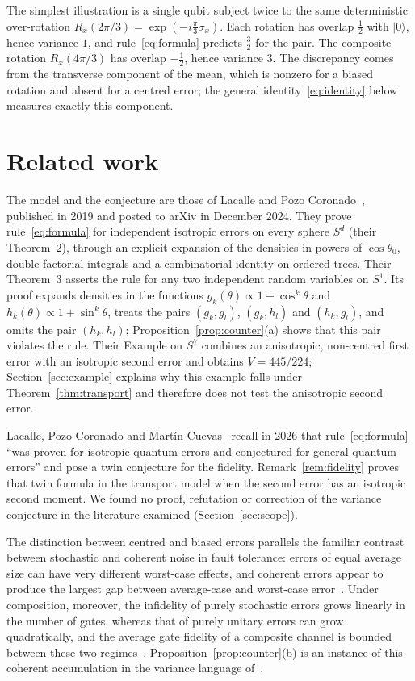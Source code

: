 \documentclass[11pt,a4paper]{article}
\theoremstyle{definition}
\theoremstyle{plain}
\newcommand{\ket}[1]{\lvert#1\rangle}
\begin{document}
The simplest illustration is a single qubit subject twice to the same
deterministic over-rotation $R_x(2\pi/3)=\exp(-i\tfrac\pi3\sigma_x)$. Each
rotation has overlap $\tfrac12$ with $\ket0$, hence variance $1$, and
rule~\eqref{eq:formula} predicts $\tfrac32$ for the pair. The composite
rotation $R_x(4\pi/3)$ has overlap $-\tfrac12$, hence variance $3$. The
discrepancy comes from the transverse component of the mean, which is
nonzero for a biased rotation and absent for a centred error; the general
identity~\eqref{eq:identity} below measures exactly this component.

\section{Related work}\label{sec:related}
The model and the conjecture are those of Lacalle and Pozo
Coronado~\cite{LacallePozo2019}, published in 2019 and posted to arXiv in
December 2024. They prove rule~\eqref{eq:formula} for independent isotropic
errors on every sphere $S^d$ (their Theorem~2), through an explicit expansion
of the densities in powers of $\cos\theta_0$, double-factorial integrals and a
combinatorial identity on ordered trees. Their Theorem~3 asserts the rule for
any two independent random variables on $S^1$. Its proof expands densities in
the functions $g_k(\theta)\propto1+\cos^k\theta$ and
$h_k(\theta)\propto1+\sin^k\theta$, treats the pairs $(g_k,g_l)$, $(g_k,h_l)$
and $(h_k,g_l)$, and omits the pair $(h_k,h_l)$; Proposition~\ref{prop:counter}(a)
shows that this pair violates the rule. Their Example on $S^7$ combines an
anisotropic, non-centred first error with an isotropic second error and
obtains $V=445/224$; Section~\ref{sec:example} explains why this example
falls under Theorem~\ref{thm:transport} and therefore does not test the
anisotropic second error.

Lacalle, Pozo Coronado and Mart\'in-Cuevas~\cite{LacallePozoMartin2026}
recall in 2026 that rule~\eqref{eq:formula} ``was proven for isotropic
quantum errors and conjectured for general quantum errors'' and pose a twin
conjecture for the fidelity. Remark~\ref{rem:fidelity} proves that twin
formula in the transport model when the second error has an isotropic second
moment. We found no proof, refutation or correction of the variance
conjecture in the literature examined (Section~\ref{sec:scope}).

The distinction between centred and biased errors parallels the familiar
contrast between stochastic and coherent noise in fault tolerance: errors of
equal average size can have very different worst-case effects, and coherent
errors appear to produce the largest gap between average-case and worst-case
error~\cite{Kueng2016}. Under composition, moreover, the infidelity of
purely stochastic errors grows linearly in the number of gates, whereas that
of purely unitary errors can grow quadratically, and the average gate
fidelity of a composite channel is bounded between these two
regimes~\cite{CarignanDugas2019}. Proposition~\ref{prop:counter}(b) is an
instance of this coherent accumulation in the variance language
of~\cite{LacallePozo2019}.
\end{document}
